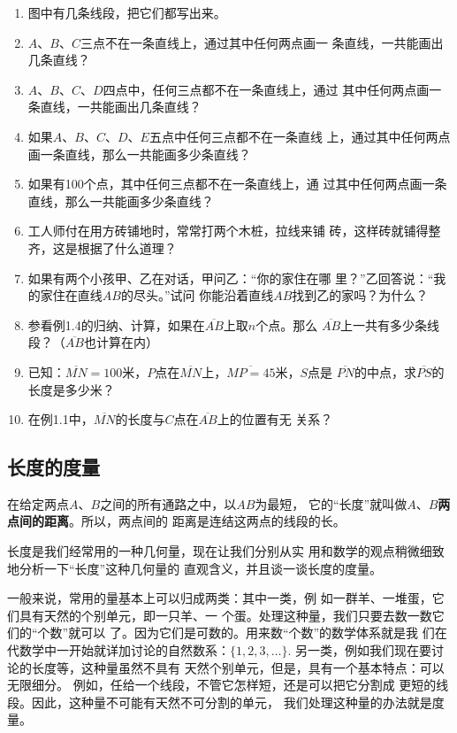 \begin{ex}
\begin{enumerate}
	\item 图中有几条线段，把它们都写出来。
	\item $A$、$B$、$C$三点不在一条直线上，通过其中任何两点画一
	条直线，一共能画出几条直线？
	\item $A$、$B$、$C$、$D$四点中，任何三点都不在一条直线上，通过
	其中任何两点画一条直线，一共能画出几条直线？
	\item 如果$A$、$B$、$C$、$D$、$E$五点中任何三点都不在一条直线
上，通过其中任何两点画一条直线，那么一共能画多少条直线？
	\item 如果有100个点，其中任何三点都不在一条直线上，通
	过其中任何两点画一条直线，那么一共能画多少条直线？
	\item 工人师付在用方砖铺地时，常常打两个木桩，拉线来铺
	砖，这样砖就铺得整齐，这是根据了什么道理？
\item 如果有两个小孩甲、乙在对话，甲问乙：“你的家住在哪
里？”乙回答说：“我的家住在直线$AB$的尽头。”试问
你能沿着直线$AB$找到乙的家吗？为什么？
\item 参看例1.4的归纳、计算，如果在$\overline{AB}$上取$n$个点。那么
$\overline{AB}$上一共有多少条线段？（$\overline{AB}$也计算在内）
\item 已知：$\overline{MN}=100$米，$P$点在$\overline{MN}$上，$\overline{MP=45}$米，$S$点是
$\overline{PN}$的中点，求$\overline{PS}$的长度是多少米？
\item 在例1.1中，$\overline{MN}$的长度与$C$点在$\overline{AB}$上的位置有无
关系？
\end{enumerate}
\end{ex}


\subsection{长度的度量}
在给定两点$A$、$B$之间的所有通路之中，以$AB$为最短，
它的“长度”就叫做$A$、$B$\textbf{两点间的距离}。所以，两点间的
距离是连结这两点的线段的长。

长度是我们经常用的一种几何量，现在让我们分别从实
用和数学的观点稍微细致地分析一下“长度”这种几何量的
直观含义，并且谈一谈长度的度量。

一般来说，常用的量基本上可以归成两类：其中一类，例
如一群羊、一堆蛋，它们具有天然的个别单元，即一只羊、一
个蛋。处理这种量，我们只要去数一数它们的“个数”就可以
了。因为它们是可数的。用来数“个数”的数学体系就是我
们在代数学中一开始就详加讨论的自然数系：$\{1,2,3,\ldots\}$. 另一类，例如我们现在要讨论的长度等，这种量虽然不具有
天然个别单元，但是，具有一个基本特点：可以无限细分。
例如，任给一个线段，不管它怎样短，还是可以把它分割成
更短的线段。因此，这种量不可能有天然不可分割的单元，
我们处理这种量的办法就是度量。

